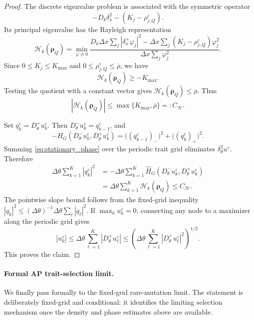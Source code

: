 \documentclass[11pt]{article}
\begin{document}
\begin{proof}
The discrete eigenvalue problem is associated with the symmetric operator
\[
    -D_k\delta_x^2-(K_j-\rho_{j,Q}^\varepsilon).
\]
Its principal eigenvalue has the Rayleigh representation
\[
    \mathcal H_k(\boldsymbol\rho_Q)
    =
    \min_{\varphi\ne0}
    \frac{
        D_k\Delta x\sum_j |\delta_x^+\varphi_j|^2
        -
        \Delta x\sum_j
        (K_j-\rho_{j,Q}^\varepsilon)\varphi_j^2
    }{
        \Delta x\sum_j\varphi_j^2
    } .
\]
Since \(0\le K_j\le K_{\max}\) and
\(0\le\rho_{j,Q}^\varepsilon\le\overline\rho\), we have
\[
    \mathcal H_k(\boldsymbol\rho_Q)\ge -K_{\max} .
\]
Testing the quotient with a constant vector gives
\(\mathcal H_k(\boldsymbol\rho_Q)\le\overline\rho\). Thus
\[
    |\mathcal H_k(\boldsymbol\rho_Q)|
    \le
    \max\{K_{\max},\overline\rho\}
    =:C_{\mathcal H}.
\]

Set \(q_k^\varepsilon=D_\theta^+u_k^\varepsilon\). Then
\(D_\theta^-u_k^\varepsilon=q_{k-1}^\varepsilon\), and
\[
    -\widehat H_G
    \left(
        D_\theta^-u_k^\varepsilon,
        D_\theta^+u_k^\varepsilon
    \right)
    =
    \bigl((q_{k-1}^\varepsilon)_{-}\bigr)^2
    +
    \bigl((q_k^\varepsilon)_{+}\bigr)^2 .
\]
Summing \eqref{eq:stationary_phase} over the periodic trait grid eliminates
\(\delta_\theta^2u^\varepsilon\). Therefore
\[
\begin{aligned}
    \Delta\theta\sum_{k=1}^K |q_k^\varepsilon|^2
    &=
    -\Delta\theta\sum_{k=1}^K
    \widehat H_G
    \left(
        D_\theta^-u_k^\varepsilon,
        D_\theta^+u_k^\varepsilon
    \right)  \\
    &=
    \Delta\theta\sum_{k=1}^K
    \mathcal H_k(\boldsymbol\rho_Q)
    \le C_{\mathcal H} .
\end{aligned}
\]
The pointwise slope bound follows from the fixed-grid inequality
\(|q_k|^2\le(\Delta\theta)^{-1}\Delta\theta\sum_\ell |q_\ell|^2\). If
\(\max_k u_k^\varepsilon=0\), connecting any node to a maximizer along the
periodic grid gives
\[
    |u_k^\varepsilon|
    \le
    \Delta\theta\sum_{\ell=1}^K |D_\theta^+u_\ell^\varepsilon|
    \le
    \left(
    \Delta\theta\sum_{\ell=1}^K |D_\theta^+u_\ell^\varepsilon|^2
    \right)^{1/2}.
\]
This proves the claim.
\end{proof}

\paragraph{Formal AP trait-selection limit.}
We finally pass formally to the fixed-grid rare-mutation limit. The statement
is deliberately fixed-grid and conditional: it identifies the limiting
selection mechanism once the density and phase estimates above are available.
\end{document}
